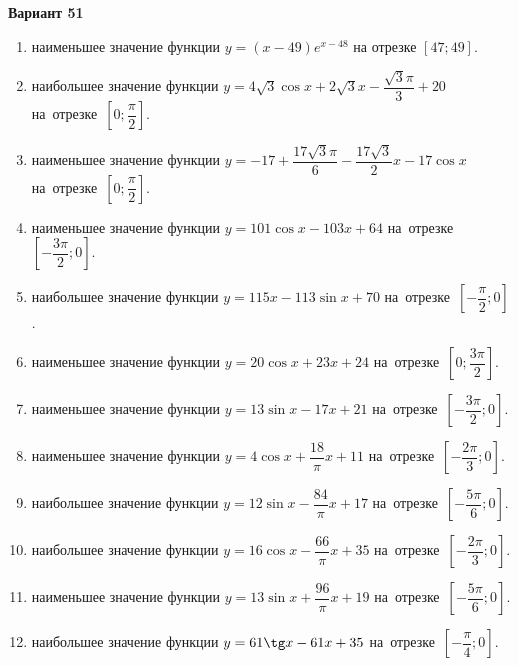 \documentclass[a4paper,10pt]{article}
\begin{document}
\begin{center}\Large\textbf{Вариант 51}\end{center}

\begin{enumerate}
\item {} наименьшее значение функции $y = \left(x-49\right)e^{x-48}$ на отрезке $\left[47;49\right]$.

\item {} наибольшее значение функции $y = 4\sqrt{3}\cos x+2\sqrt{3}x-\dfrac{\sqrt{3}\pi}{3} +20$ на~отрезке~$\left[0;\dfrac{\pi }{2}\right]$.

\item {} наименьшее значение функции $y = -17+\dfrac{17\sqrt{3} \pi}{6}-\dfrac{17\sqrt{3}}{2}x-17\cos x$ на~отрезке~$\left[0;\dfrac{\pi }{2}\right]$.

\item {} наименьшее значение функции $y = 101\cos x-103x+64$ на~отрезке~$\left[-\dfrac{3\pi }{2};0\right]$.

\item {} наибольшее значение функции $y = 115x-113\sin x+70$ на~отрезке~$\left[-\dfrac{\pi }{2};0\right]$.

\item {} наименьшее значение функции $y = 20\cos x+23x+24$ на~отрезке~$\left[0;\dfrac{3\pi }{2}\right]$.

\item {} наименьшее значение функции $y = 13\sin x-17x+21$ на~отрезке~$\left[-\dfrac{3\pi }{2};0\right]$.

\item {} наименьшее значение функции $y = 4\cos x+\dfrac{18}{\pi }x +11$ на~отрезке~$\left[-\dfrac{2\pi }{3};0\right]$.

\item {} наибольшее значение функции $y = 12\sin x-\dfrac{84}{\pi }x+17$ на~отрезке~$\left[-\dfrac{5\pi }{6};0\right]$.

\item {} наибольшее значение функции $y = 16\cos x-\dfrac{66}{\pi }x+35$ на~отрезке~$\left[-\dfrac{2\pi }{3};0\right]$.

\item {} наименьшее значение функции $y = 13\sin x+\dfrac{96}{\pi }x+19$ на~отрезке~$\left[-\dfrac{5\pi }{6};0\right]$.

\item {} наибольшее значение функции $y = 61\tg x-61x+35$ на~отрезке~$\left[-\dfrac{\pi }{4};0\right]$.


\end{enumerate}
\end{document}

